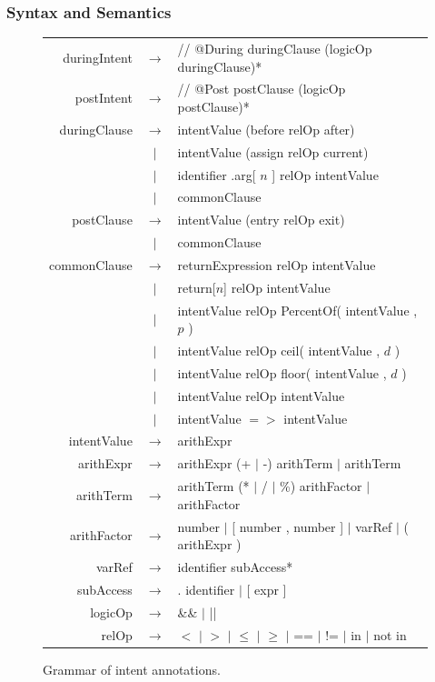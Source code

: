 \documentclass[pdflatex,sn-basic]{sn-jnl}%
\theoremstyle{thmstyleone}%
\theoremstyle{thmstyletwo}%
\theoremstyle{thmstylethree}%
\begin{document}
\subsubsection{Syntax and Semantics}\label{sec:intent-semantics}

\begin{figure}[t]
\centering
\small
\begin{tabular}{@{}r@{\quad}c@{\quad}l@{}}
duringIntent & $\rightarrow$ & // @During duringClause (logicOp duringClause)* \\[2pt]
postIntent & $\rightarrow$ & // @Post postClause (logicOp postClause)* \\[6pt]

duringClause & $\rightarrow$ & intentValue (before relOp after) \\
& $|$ & intentValue (assign relOp current) \\
& $|$ & identifier .arg[ $n$ ] relOp intentValue \\
& $|$ & commonClause \\[6pt]

postClause & $\rightarrow$ & intentValue (entry relOp exit) \\
& $|$ & commonClause \\[6pt]

commonClause & $\rightarrow$ & returnExpression relOp intentValue \\
& $|$ & return[$n$] relOp intentValue \\
& $|$ & intentValue relOp PercentOf( intentValue , $p$ ) \\
& $|$ & intentValue relOp ceil( intentValue , $d$ ) \\
& $|$ & intentValue relOp floor( intentValue , $d$ ) \\
& $|$ & intentValue relOp intentValue \\
& $|$ & intentValue ${=}{>}$ intentValue \\[6pt]

intentValue & $\rightarrow$ & arithExpr \\[2pt]
arithExpr & $\rightarrow$ & arithExpr (+ $|$ -) arithTerm $|$ arithTerm \\
arithTerm & $\rightarrow$ & arithTerm (* $|$ / $|$ \%) arithFactor $|$ arithFactor \\
arithFactor & $\rightarrow$ & number $|$ [ number , number ] $|$ varRef $|$ ( arithExpr ) \\[2pt]
varRef & $\rightarrow$ & identifier subAccess* \\
subAccess & $\rightarrow$ & . identifier $|$ [ expr ] \\[6pt]

logicOp & $\rightarrow$ & \&\& $|$ || \\
relOp & $\rightarrow$ & $<$ $|$ $>$ $|$ $\leq$ $|$ $\geq$ $|$ == $|$ != $|$ in $|$ not in \\
\end{tabular}
\caption{Grammar of intent annotations.}
\label{fig:intent-grammar}
\end{figure}
\end{document}
